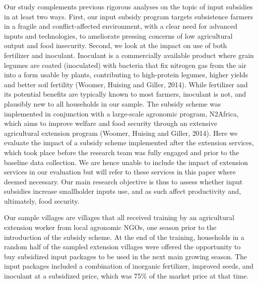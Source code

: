 Our study complements previous rigorous analyses on the topic of input subsidies in at least two ways. First, our input subsidy program targets subsistence farmers in a fragile and conflict-affected environment, with a clear need for advanced inputs and technologies, to ameliorate pressing concerns of low agricultural output and food insecurity. Second, we look at the impact on use of both fertilizer and inoculant. Inoculant is a commercially available product where grain legumes are coated (inoculated) with bacteria that fix nitrogen gas from the air into a form usable by plants, contributing to high-protein legumes, higher yields and better soil fertility (Woomer, Huising and Giller, 2014). While fertilizer and its potential benefits are typically known to most farmers, inoculant is not, and plausibly new to all households in our sample. The subsidy scheme was implemented in conjunction with a large-scale agronomic program, N2Africa, which aims to improve welfare and food security through an extensive agricultural extension program (Woomer, Huising and Giller, 2014). Here we evaluate the impact of a subsidy scheme implemented after the extension services, which took place before the research team was fully engaged and prior to the baseline data collection. We are hence unable to include the impact of extension services in our evaluation but will refer to these services in this paper where deemed necessary. Our main research objective is thus to assess whether input subsidies increase smallholder inputs use, and as such affect productivity and, ultimately, food security. 

Our sample villages are villages that all received training by an agricultural extension worker from local agronomic NGOs, one season prior to the introduction of the subsidy scheme. At the end of the training, households in a random half of the sampled extension villages were offered the opportunity to buy subsidized input packages to be used in the next main growing season. The input packages included a combination of inorganic fertilizer, improved seeds, and inoculant at a subsidized price, which was 75\% of the market price at that time.

